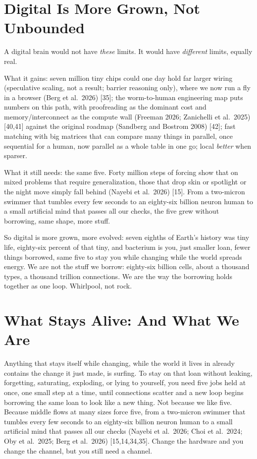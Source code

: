 \documentclass[11pt,a4paper]{article}
\begin{document}
\section{Digital Is More Grown, Not Unbounded}

A digital brain would not have \emph{these} limits. It would have \emph{different} limits, equally real.

What it gains: seven million tiny chips could one day hold far larger wiring (speculative scaling, not a result; barrier reasoning only), where we now run a fly in a browser (Berg et al.\ 2026) [35]; the worm-to-human engineering map puts numbers on this path, with proofreading as the dominant cost and memory/interconnect as the compute wall (Freeman 2026; Zanichelli et al.\ 2025) [40,41] against the original roadmap (Sandberg and Bostrom 2008) [42]; fast matching with big matrices that can compare many things in parallel, once sequential for a human, now parallel as a whole table in one go; local \emph{better} when sparser.

What it still needs: the same five. Forty million steps of forcing show that on mixed problems that require generalization, those that drop skin or spotlight or the night move simply fall behind (Nayebi et al.\ 2026) [15]. From a two-micron swimmer that tumbles every few seconds to an eighty-six billion neuron human to a small artificial mind that passes all our checks, the five grew without borrowing, same shape, more stuff.

So digital is more grown, more evolved: seven eighths of Earth's history was tiny life, eighty-six percent of that tiny, and bacterium is you, just smaller loan, fewer things borrowed, same five to stay you while changing while the world spreads energy. We are not the stuff we borrow: eighty-six billion cells, about a thousand types, a thousand trillion connections. We are the way the borrowing holds together as one loop. Whirlpool, not rock.

\section{What Stays Alive: And What We Are}

Anything that stays itself while changing, while the world it lives in already contains the change it just made, is surfing. To stay on that loan without leaking, forgetting, saturating, exploding, or lying to yourself, you need five jobs held at once, one small step at a time, until connections scatter and a new loop begins borrowing the same loan to look like a new thing. Not because we like five. Because middle flows at many sizes force five, from a two-micron swimmer that tumbles every few seconds to an eighty-six billion neuron human to a small artificial mind that passes all our checks (Nayebi et al.\ 2026; Choi et al.\ 2024; Oby et al.\ 2025; Berg et al.\ 2026) [15,14,34,35]. Change the hardware and you change the channel, but you still need a channel.
\end{document}
